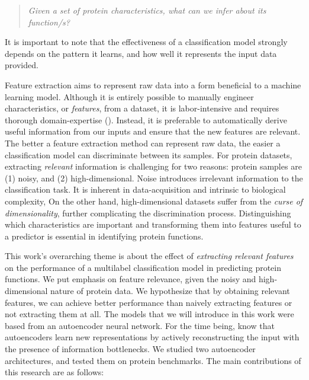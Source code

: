 \begin{quote}
    \itshape
    \small
    Given a set of protein characteristics, what can we infer about
    its function/s?
\end{quote}

\noindent It is important to note that the effectiveness of a classification
model strongly depends on the pattern it learns, and how well it represents
the input data provided.

\par Feature extraction aims to represent raw data into a form beneficial to
a machine learning model. Although it is entirely possible to manually
engineer characteristics, or \textit{features}, from a dataset, it is
labor-intensive and requires thorough domain-expertise
(\cite{bengio2013representation}). Instead, it is preferable to automatically
derive useful information from our inputs and ensure that the new features
are relevant. The better a feature extraction method can represent raw data,
the easier a classification model can discriminate between its samples. For
protein datasets, extracting \textit{relevant} information is challenging for
two reasons: protein samples are (1) noisy, and (2) high-dimensional. Noise
introduces irrelevant information to the classification task. It is inherent
in data-acquisition and intrinsic to biological complexity, On the other
hand, high-dimensional datasets suffer from the \textit{curse of
dimensionality}, further complicating the discrimination process.
Distinguishing which characteristics are important and transforming them into
features useful to a predictor is essential in identifying protein functions.

\newpage

\par This work's overarching theme is about the effect of \textit{extracting
relevant features} on the performance of a multilabel classification model in
predicting protein functions. We put emphasis on feature relevance, given the
noisy and high-dimensional nature of protein data. We hypothesize that by
obtaining relevant features, we can achieve better performance than naively
extracting features or not extracting them at all. The models that we will
introduce in this work were based from an autoencoder neural network. For the
time being, know that autoencoders learn new representations by actively
reconstructing the input with the presence of information bottlenecks. We
studied two autoencoder architectures, and tested them on protein benchmarks.
The main contributions of this research are as follows:

